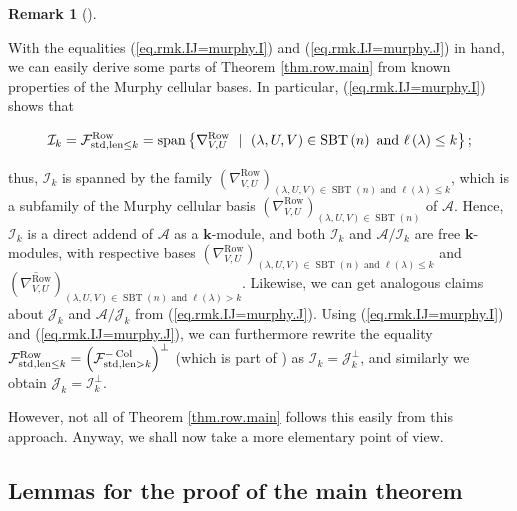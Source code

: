 \documentclass[numbers=enddot,12pt,final,onecolumn,notitlepage]{scrartcl}%
\numberwithin{exer}{subsection}
\theoremstyle{definition}
\newtheorem{remk}[theo]{Remark}
\newenvironment{remark}[1][]
{\begin{remk}[#1]\begin{leftbar}}
{\end{leftbar}\end{remk}}
\newcommand{\MurpF}{\vphantom{\int_g^g}\mathcal{F}}
\begin{document}
\begin{remark}
With the equalities (\ref{eq.rmk.IJ=murphy.I}) and (\ref{eq.rmk.IJ=murphy.J})
in hand, we can easily derive some parts of Theorem \ref{thm.row.main} from
known properties of the Murphy cellular bases. In particular,
(\ref{eq.rmk.IJ=murphy.I}) shows that%
\[
\mathcal{I}_{k}=\MurpF_{\operatorname*{std},\operatorname*{len}\leq
k}^{\operatorname*{Row}}=\operatorname*{span}\left\{  \nabla_{V,U}%
^{\operatorname*{Row}}\ \mid\ \left(  \lambda,U,V\right)  \in
\operatorname*{SBT}\left(  n\right)  \text{ and }\ell\left(  \lambda\right)
\leq k\right\}  ;
\]
thus, $\mathcal{I}_{k}$ is spanned by the family $\left(  \nabla
_{V,U}^{\operatorname*{Row}}\right)  _{\left(  \lambda,U,V\right)
\in\operatorname*{SBT}\left(  n\right)  \text{ and }\ell\left(  \lambda
\right)  \leq k}$, which is a subfamily of the Murphy cellular basis $\left(
\nabla_{V,U}^{\operatorname*{Row}}\right)  _{\left(  \lambda,U,V\right)
\in\operatorname*{SBT}\left(  n\right)  }$ of $\mathcal{A}$. Hence,
$\mathcal{I}_{k}$ is a direct addend of $\mathcal{A}$ as a $\mathbf{k}%
$-module, and both $\mathcal{I}_{k}$ and $\mathcal{A}/\mathcal{I}_{k}$ are
free $\mathbf{k}$-modules, with respective bases $\left(  \nabla
_{V,U}^{\operatorname*{Row}}\right)  _{\left(  \lambda,U,V\right)
\in\operatorname*{SBT}\left(  n\right)  \text{ and }\ell\left(  \lambda
\right)  \leq k}$ and $\left(  \overline{\nabla_{V,U}^{\operatorname*{Row}}%
}\right)  _{\left(  \lambda,U,V\right)  \in\operatorname*{SBT}\left(
n\right)  \text{ and }\ell\left(  \lambda\right)  >k}$. Likewise, we can get
analogous claims about $\mathcal{J}_{k}$ and $\mathcal{A}/\mathcal{J}_{k}$
from (\ref{eq.rmk.IJ=murphy.J}). Using (\ref{eq.rmk.IJ=murphy.I}) and
(\ref{eq.rmk.IJ=murphy.J}), we can furthermore rewrite the equality
$\MurpF_{\operatorname*{std},\operatorname*{len}\leq k}^{\operatorname*{Row}%
}=\left(  \MurpF_{\operatorname*{std},\operatorname*{len}>k}%
^{-\operatorname*{Col}}\right)  ^{\perp}$ (which is part of \cite[Theorem
6.8.47]{sga}) as $\mathcal{I}_{k}=\mathcal{J}_{k}^{\perp}$, and similarly we
obtain $\mathcal{J}_{k}=\mathcal{I}_{k}^{\perp}$.

However, not all of Theorem \ref{thm.row.main} follows this easily from this
approach. Anyway, we shall now take a more elementary point of view.
\end{remark}

\subsection{Lemmas for the proof of the main theorem}
\end{document}
